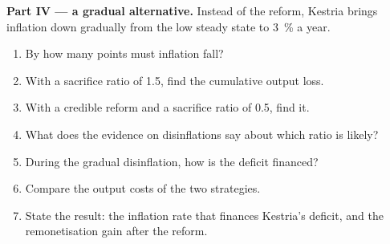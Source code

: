 \begin{problem}
\medskip\noindent\textbf{Part IV --- a gradual alternative.} Instead of the reform,
Kestria brings inflation down gradually from the low steady state to 3~\% a year.
\begin{enumerate}[resume]
\item By how many points must inflation fall?
\item With a sacrifice ratio of 1.5, find the cumulative output loss.
\item With a credible reform and a sacrifice ratio of 0.5, find it.
\item What does the evidence on disinflations say about which ratio is likely?
\item During the gradual disinflation, how is the deficit financed?
\item Compare the output costs of the two strategies.
\item State the result: the inflation rate that finances Kestria's deficit, and the
remonetisation gain after the reform.
\end{enumerate}
\end{problem}
